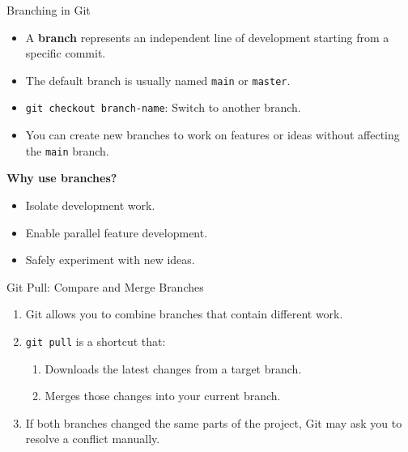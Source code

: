 \documentclass[12pt]{beamer}
\begin{document}
\begin{frame}{Branching in Git}
  \begin{itemize}
    \item A \textbf{branch} represents an independent line of development starting from a specific commit.
    \item The default branch is usually named \texttt{main} or \texttt{master}.
    \item \texttt{git checkout branch-name}: Switch to another branch.
    \item You can create new branches to work on features or ideas without affecting the \texttt{main} branch.
  \end{itemize}

  \vspace{1em}
  \textbf{Why use branches?}
  \vspace{1em}
  
  \begin{itemize}
    \item Isolate development work.
    \item Enable parallel feature development.
    \item Safely experiment with new ideas.
  \end{itemize}
\end{frame}

\begin{frame}{Git Pull: Compare and Merge Branches}
  \begin{enumerate}
    \setlength\itemsep{1em}
    \item Git allows you to combine branches that contain different work.
    \item \texttt{git pull} is a shortcut that:
    \begin{enumerate}
      \setlength\itemsep{1em}
      \item Downloads the latest changes from a target branch.
      \item Merges those changes into your current branch.
    \end{enumerate}
    \item If both branches changed the same parts of the project, Git may ask you to resolve a conflict manually.
  \end{enumerate}
\end{frame}
\end{document}
